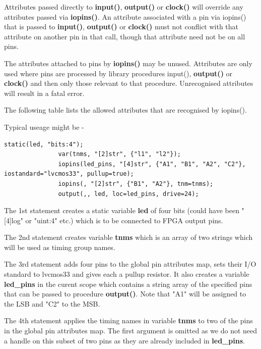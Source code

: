             Attributes passed directly to {\bf input()}, {\bf output()} or {\bf
            clock()} will override any attributes passed via {\bf iopins()}. An
            attribute associated with a pin via iopins() that is passed to {\bf
            input()}, {\bf output()} or {\bf clock()} must not conflict with that
            attribute on another pin in that call, though that attribute need not
            be on all pins.

            The attributes attached to pins by {\bf iopins()} may be unused.
            Attributes are only used where pins are processed by library procedures
            input(), {\bf output()} or {\bf clock()} and then only those relevant
            to that procedure. Unrecognised attributes will result in a fatal
            error.
            
            The following table lists the allowed attributes that are recognised
            by iopins().
            
                        
            Typical useage might be -
            \begin{lstlisting}[gobble=12, language=threepl]
               static(led, "bits:4");
               var(tnms, "[2]str", {"l1", "l2"});
               iopins(led_pins, "[4]str", {"A1", "B1", "A2", "C2"}, iostandard="lvcmos33", pullup=true);
               iopins(, "[2]str", {"B1", "A2"}, tnm=tnms);
               output(,, led, loc=led_pins, drive=24);
            \end{lstlisting}
            
            The 1st statement creates a static variable {\bf led} of four bits
            (could have been "[4]log" or "uint:4" etc.) which is to be connected to
            FPGA output pins.

            The 2nd statement creates variable {\bf tnms} which is an array of two
            strings which will be used as timing group names.

            The 3rd statement adds four pins to the global pin attributes map, sets
            their I/O standard to lvcmos33 and gives each a pullup resistor. It 
            also creates a variable {\bf led\_pins} in the curent scope which
            contains a string array of the specified pins that can be passed to
            procedure {\bf output()}. Note that "A1" will be assigned to the LSB
            and "C2" to the MSB.

            The 4th statement applies the timing names in variable {\bf tnms} to
            two of the pins in the global pin attributes map. The first argument is
            omitted as we do not need a handle on this subset of two pins as they
            are already included in {\bf led\_pins}.

